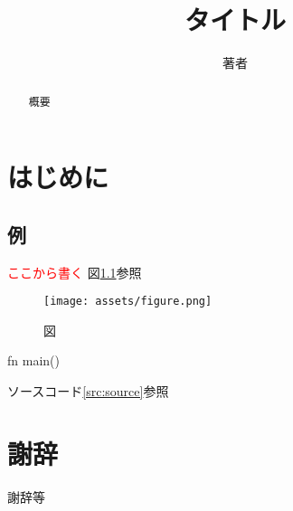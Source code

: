 \documentclass[a4j,12pt]{ltjsreport}
\title{タイトル}
\author{著者}
\newcommand{\sourceref}[1]{ソースコード\ref{#1}}
\newcommand{\todo}[1]{\textcolor{red}{#1}}
\begin{document}
\maketitle


\begin{abstract}
概要
\end{abstract}

\tableofcontents
\pagebreak
{}
\pagebreak

\chapter{はじめに}\label{chap:intro}
\section{例}
\todo{ここから書く}
図\ref{fig:figure}参照

\begin{figure}[htbp]
    \centering
    \texttt{[image: assets/figure.png]}
    \caption{図}
    \label{fig:figure}
\end{figure}

\begin{source}[label=src:source,caption={ソースコード}]
fn main() {
}
\end{source}

\sourceref{src:source}参照

\chapter*{謝辞}
謝辞等



\end{document}
